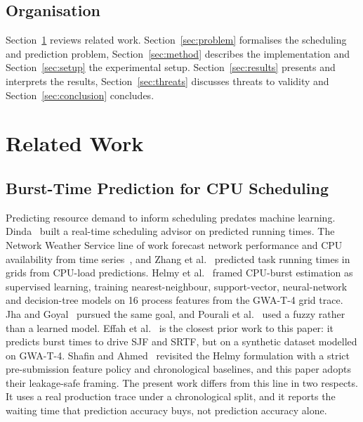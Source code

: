 \documentclass[conference]{IEEEtran}
\begin{document}
\subsection{Organisation}
Section~\ref{sec:related} reviews related work.
Section~\ref{sec:problem} formalises the scheduling and prediction problem,
Section~\ref{sec:method} describes the implementation and
Section~\ref{sec:setup} the experimental setup. Section~\ref{sec:results}
presents and interprets the results, Section~\ref{sec:threats} discusses
threats to validity and Section~\ref{sec:conclusion} concludes.

\section{Related Work}
\label{sec:related}


\subsection{Burst-Time Prediction for CPU Scheduling}
Predicting resource demand to inform scheduling predates machine learning.
Dinda~\cite{dinda_prediction_2002} built a real-time scheduling advisor on
predicted running times. The Network Weather Service line of work forecast
network performance and CPU availability from
time series~\cite{wolski_dynamically_1998,wolski_predicting_2000,yang_homeostatic_2003},
and Zhang et al.~\cite{zhang_predict_2008} predicted task running times in
grids from CPU-load predictions. Helmy et al.~\cite{helmy_machine_2015}
framed CPU-burst estimation as supervised learning, training
nearest-neighbour, support-vector, neural-network and decision-tree models on
16 process features from the GWA-T-4 grid trace. Jha and
Goyal~\cite{jha_cpu_2022} pursued the same goal, and Pourali et
al.~\cite{pourali_fuzzy_undated} used a fuzzy rather than a learned model.
Effah et al.~\cite{effah_predicting_2025} is the closest prior work to this
paper: it predicts burst times to drive SJF and SRTF, but on a synthetic
dataset modelled on GWA-T-4. Shafin and Ahmed~\cite{shafin_leakage_2026}
revisited the Helmy formulation with a strict pre-submission feature policy
and chronological baselines, and this paper adopts their leakage-safe
framing. The present work differs from this line in two respects. It uses a
real production trace under a chronological split, and it reports the
waiting time that prediction accuracy buys, not prediction accuracy alone.
\end{document}
